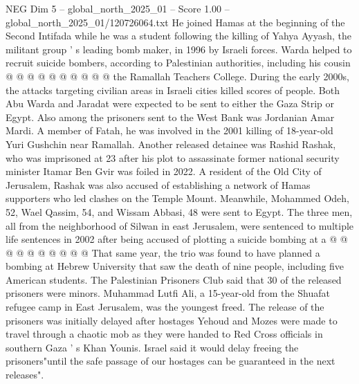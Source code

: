\begin{textsample}{NEG Dim 5 – global\_north\_2025\_01 – Score 1.00 – global\_north\_2025\_01/120726064.txt}
He joined Hamas at the beginning of the Second Intifada while he was a student following the killing of Yahya Ayyash, the militant group ' s leading bomb maker, in 1996 by Israeli forces.
Warda helped to recruit suicide bombers, according to Palestinian authorities, including his cousin @ @ @ @ @ @ @ @ @ @ the Ramallah Teachers College.
During the early 2000s, the attacks targeting civilian areas in Israeli cities killed scores of people.
Both Abu Warda and Jaradat were expected to be sent to either the Gaza Strip or Egypt.
Also among the prisoners sent to the West Bank was Jordanian Amar Mardi.
A member of Fatah, he was involved in the 2001 killing of 18-year-old Yuri Gushchin near Ramallah.
Another released detainee was Rashid Rashak, who was imprisoned at 23 after his plot to assassinate former national security minister Itamar Ben Gvir was foiled in 2022.
A resident of the Old City of Jerusalem, Rashak was also accused of establishing a network of Hamas supporters who led clashes on the Temple Mount.
Meanwhile, Mohammed Odeh, 52, Wael Qassim, 54, and Wissam Abbasi, 48 were sent to Egypt.
The three men, all from the neighborhood of Silwan in east Jerusalem, were sentenced to multiple life sentences in 2002 after being accused of plotting a suicide bombing at a @ @ @ @ @ @ @ @ @ @ That same year, the trio was found to have planned a bombing at Hebrew University that saw the death of nine people, including five American students.
The Palestinian Prisoners Club said that 30 of the released prisoners were minors.
Muhammad Lutfi Ali, a 15-year-old from the Shuafat refugee camp in East Jerusalem, was the youngest freed.
The release of the prisoners was initially delayed after hostages Yehoud and Mozes were made to travel through a chaotic mob as they were handed to Red Cross officials in southern Gaza ' s Khan Younis.
Israel said it would delay freeing the prisoners"until the safe passage of our hostages can be guaranteed in the next releases".

\end{textsample}
